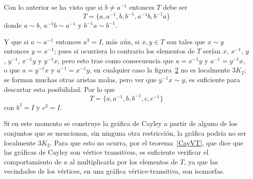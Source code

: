 \documentclass[12pt]{book}
\theoremstyle{definition}
\begin{document}
\begin{figure}
  \centering
  \caption{}\label{e=b-1}
\end{figure}




Con lo anterior se ha visto que si $ b\neq a^{-1}$ entonces $T$ debe
ser $$T=\{a, a^{-1}, b, b^{-1}, a^{-1}b, b^{-1}a\}$$ donde $a\sim b$,
$a^{-1}b\sim a^{-1}$ y $b^{-1}a\sim b^{-1}$.

Y que si $a\sim a^{-1}$ entonces $a^3=I$, m\'as a\'un, si $x,y\in T$
son tales que $x\sim y$ entonces $y=x^{-1}$; pues si ocurriera lo
contrario los elementos de $T$ serían $x$, $x^{-1}$, $y$, $y^{-1}$,
$x^{-1}y$ y $y^{-1}x$, pero esto trae como consecuencia que $a=
x^{-1}y$ y $a^{-1}=y^{-1}x$, o que $a=y^{-1}x$ y $a^{-1}= x^{-1}y$, en
cualquier caso la figura~\ref{b=c,a^3} no es localmente $3K_2$; se
forman muchas otras aristas malas, pero ver que $y^{-1}x \sim y$, es
suficiente para descartar esta posibilidad. Por lo que
$$T=\{a,a^{-1},b,b^{-1},c, c^{-1}\}$$ con $b^3=I$ y $c^{3}=I$.



\begin{figure}
  \centering
  \caption{}\label{b=c,a^3}
\end{figure}

Si en este momento se construye la gráfica de Cayley a partir de
alguno de los conjuntos que se mencionan, sin ninguna otra
restricción, la gráfica podría no ser localmente $3K_2$. Para que esto
no ocurra, por el teorema~\ref{CayVT}, que dice que las gráficas de
Cayley son vértice transitivas, es suficiente verificar el
comportamiento de $a$ al multiplicarla por los elementos de $T$, ya
que las vecindades de los vértices, en una gráfica
vértice-transitiva, son isomorfas.
\end{document}
